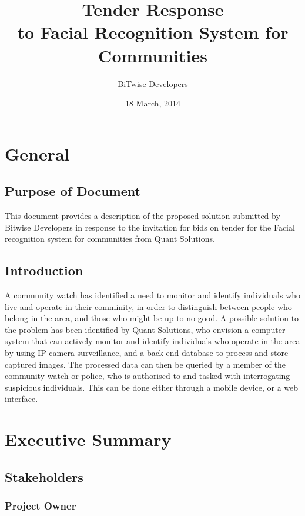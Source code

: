 \documentclass[a4paper]{article}
\title{\Huge{Tender Response} \\[1cm] \LARGE{to Facial Recognition System for Communities \\[3cm]}}
\author{BiTwise Developers \\[0.5cm]}
\date{18 March, 2014}
\begin{document}
\maketitle
\newpage

\tableofcontents
\newpage

	\section{General}
	
		\subsection{Purpose of Document}
		
		This document provides a description of the proposed solution submitted by Bitwise Developers in response to the invitation 
		for bids on tender for the Facial recognition system for communities from Quant Solutions.
		
		\subsection{Introduction}
		
		A community watch has identified a need to monitor and identify individuals who live and operate in their comminity, in order to 
		distinguish between people who belong in the area, and those who might be up to no good. 
		A possible solution to the problem has been identified by Quant Solutions, who envision a computer system that can actively monitor
		and identify individuals who operate in the area by using IP camera surveillance, and a back-end database to process and store captured
		images. The processed data can then be queried by a member of the community watch or police, who is authorised to and tasked with interrogating
		suspicious individuals. This can be done either through a mobile device, or a web interface.
		
	\section{Executive Summary}

		\subsection{Stakeholders}
		
			\subsubsection{Project Owner}
			
\end{document}
